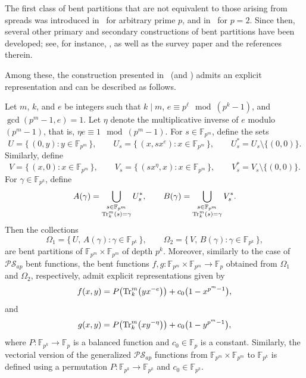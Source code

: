 \documentclass[12pt]{article}
\theoremstyle{plain}
\theoremstyle{definition}
\renewcommand{\to}{\rightarrow}
\newcommand{\Tr}{{\rm Tr}}
\begin{document}
	The first class of bent partitions that are not equivalent to those arising from spreads 
	was introduced in~\cite{nuwi22} for arbitrary prime $p$, and in~\cite{mp} for $p=2$. Since then, several other primary 
	and secondary constructions of bent partitions have been developed; see, 
	for instance, \cite{aakm25,Anbar2025Preprint,akm22a,wfw}, as well as the survey paper 
	\cite{akm25} and the references therein. 
	
	Among these, the construction presented in~\cite{nuwi22} (and  \cite{mp}) admits an explicit 
	representation and can be described as follows.
	
	Let \(m\), \(k\), and \(e\) be integers such that \(k \mid m\),
	\(e \equiv p^{\ell} \mod{(p^{k}-1)}\), and
	\(\gcd(p^{m}-1, e) = 1\).
	Let \(\eta\) denote the multiplicative inverse of \(e\) modulo \((p^{m}-1)\), that
	is, $\eta e \equiv 1 \mod{(p^{m}-1)}$.
	For \(s \in \mathbb{F}_{p^{m}}\), define the sets
	\begin{equation}\label{eq:U}
		U = \{\, (0, y) : y \in \mathbb{F}_{p^{m}} \,\}, \qquad
		U_s = \{\, (x, s x^{e}) : x \in \mathbb{F}_{p^{m}} \,\},
		\qquad
		U_s^{\ast} = U_s \setminus \{(0,0)\}.
	\end{equation}
	Similarly, define
	\begin{equation}\label{eq:Bgamma}
		V = \{\, (x, 0) : x \in \mathbb{F}_{p^{m}} \,\}, \qquad
		V_s = \{\, (s x^{\eta}, x) : x \in \mathbb{F}_{p^{m}} \,\},
		\qquad
		V_s^{\ast} = V_s \setminus \{(0,0)\}.
	\end{equation}
	For \(\gamma \in \mathbb{F}_{p^{k}}\), define
	\begin{align}\label{eq:Agamma}
		A(\gamma)
		=
		\bigcup_{\substack{s \in \mathbb{F}_{p^{m}} \\
				\Tr_{k}^{m}(s) = \gamma}}
		U_s^{\ast},
		\qquad
		B(\gamma)
		=
		\bigcup_{\substack{s \in \mathbb{F}_{p^{m}} \\
				\Tr_{k}^{m}(s) = \gamma}}
		V_s^{\ast}.  
	\end{align}
	Then the collections
	\begin{equation}\label{eq:Gamma}
		\Omega_1 = \{\,U ,\, A(\gamma) : \gamma \in \mathbb{F}_{p^{k}} \,\},
		\qquad
		\Omega_2 =  \{\, V ,\, B(\gamma) : \gamma \in \mathbb{F}_{p^{k}} \,\}, 
	\end{equation}
	are bent partitions of \(\mathbb{F}_{p^{m}} \times \mathbb{F}_{p^{m}}\) of depth
	\(p^{k}\). Moreover, similarly to the case of \(\mathcal{PS}_{ap}\) bent
	functions, the bent functions
	\(f, g : \mathbb{F}_{p^{m}} \times \mathbb{F}_{p^{m}} \to \mathbb{F}_{p}\)
	obtained from \(\Omega_1\) and \(\Omega_2\), respectively, admit explicit
	representations given by
	\[
	f(x,y)
	=
	P\!\left(\Tr_{k}^{m}\!\left(y x^{-e}\right)\right)
	+ c_0 \bigl(1 - x^{p^{m}-1}\bigr),
	\]
	and
	\[
	g(x,y)
	=
	P\!\left(\Tr_{k}^{m}\!\left(x y^{-\eta}\right)\right)
	+ c_0 \bigl(1 - y^{p^{m}-1}\bigr),
	\]
	where \(P : \mathbb{F}_{p^{k}} \to \mathbb{F}_{p}\) is a balanced function and
	\(c_0 \in \mathbb{F}_{p}\) is a constant. Similarly, the vectorial version of the generalized \(\mathcal{PS}_{ap}\)
	functions from $\mathbb{F}_{p^{m}} \times \mathbb{F}_{p^{m}}$ to $\mathbb{F}_{p^{k}}$
	is defined using a permutation
	\(P \colon \mathbb{F}_{p^{k}} \to \mathbb{F}_{p^{k}}\) and $c_0\in \mathbb{F}_{p^{k}}$.
	
\end{document}
